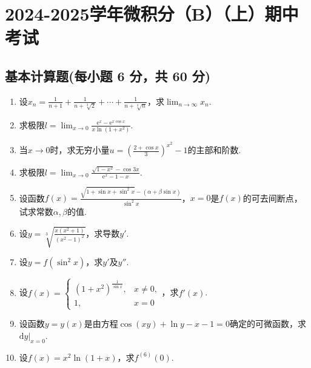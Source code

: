 \documentclass[../main.tex]{subfiles}
\begin{document}
\chapter{2024-2025学年微积分（B）（上）期中考试}

\section{基本计算题(每小题 6 分，共 60 分)}
\begin{enumerate}
    \item 设$x_{n}=\frac{1}{n+1}+\frac{1}{n+\sqrt[3]{2}}+\cdots+\frac{1}{n+\sqrt[3]{n}}$，求$\lim
              _{n\to\infty}x_{n}$.
          \vspace{11em}

    \item 求极限$l=\lim_{x\to0}\frac{\mathrm{e}^{x}-\mathrm{e}^{x\cos x}}{x\ln(1+x^{2})}
              .$
          \vspace{11em}

    \item 当$x\to0$时，求无穷小量$u=\left(\frac{2+\cos x}{3}\right)^{x^2}-1$的主部和阶数.
          \vspace{11em}

    \item 求极限$l=\lim_{x\to0}\frac{\sqrt{1-x^2}-\cos 3x}{\mathrm{e}^{x}-1-x}$.
          \vspace{9em}

    \item 设函数$f(x)=\frac{\sqrt{1+\sin x+\sin^{2}x}-(\alpha+\beta\sin x)}{\sin^{2}x}$，$x
              =0$是$f(x)$的可去间断点，试求常数$\alpha,\beta$的值.
          \vspace{9em}

    \item 设$y=\sqrt[3]{\frac{x(x^{2}+1)}{(x^{2}-1)^{2}}}$，求导数$y'$.
          \vspace{10em}

    \item 设$y=f(\sin^{2}x)$，求$y'$及$y''$.
          \vspace{10em}

    \item 设$f(x)=
              \begin{cases}
                  (1+x^{2})^{\frac{1}{\sin x}}, & x\neq0, \\
                  1,                            & x=0
              \end{cases}$，求$f'(x)$.
          \vspace{10em}

    \item 设函数$y=y(x)$是由方程$\cos(xy)+\ln y-x-1=0$确定的可微函数，求$\left.\mathrm{d}
              y\right|_{x=0}$.
          \vspace{10em}

    \item 设$f(x)=x^{2}\ln(1+x)$，求$f^{(6)}(0)$.
          \vspace{10em}
\end{enumerate}
\end{document}
